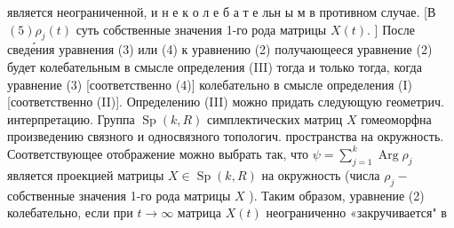 \documentclass[10pt]{article}
\begin{document}
является неограниченной, и н е к о л е б а т е льн ы м в противном случае. [В $(5) \rho_{j}(t)$ суть собственные значения 1-го рода матрицы $X(t)$. ] После сведе́ния уравнения (3) или (4) к уравнению (2) получающееся уравнение (2) будет колебательным в смысле определения (III) тогда и только тогда, когда уравнение (3) [соответственно (4)] колебательно в смысле определения (I) [соответственно (II)]. Определению (III) можно придать следующую геометрич. интерпретацию. Группа $\operatorname{Sp}(k, R)$ симплектических матриц $X$ гомеоморфна произведению связного и односвязного топологич. пространства на окружность. Соответствующее отображение можно выбрать так, что $\psi=\sum_{j=1}^{k} \operatorname{Arg} \rho_{j}$ является проекцией матрицы $X \in \operatorname{Sp}(k, R)$ на окружность (числа $\rho_{j}-$ собственные значения 1-го рода матрицы $X$ ). Таким образом, уравнение (2) колебательно, если при $t \rightarrow \infty$ матрица $X(t)$ неограниченно «закручивается" в
\end{document}
